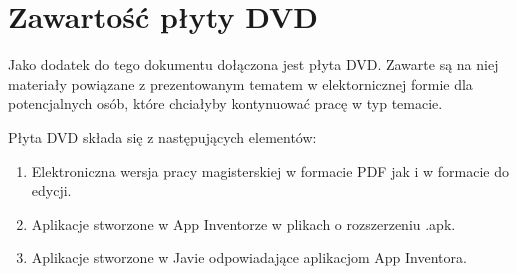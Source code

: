 \chapter{Zawartość płyty DVD}

Jako dodatek do tego dokumentu dołączona jest płyta DVD. Zawarte są na niej materiały powiązane z prezentowanym tematem w elektornicznej formie dla potencjalnych osób, które chciałyby kontynuować pracę w typ temacie.

Płyta DVD składa się z następujących elementów:
\begin{enumerate}
\item Elektroniczna wersja pracy magisterskiej w formacie PDF jak i w formacie do edycji.
\item Aplikacje stworzone w App Inventorze w plikach o rozszerzeniu .apk.
\item Aplikacje stworzone w Javie odpowiadające aplikacjom App Inventora.
\end{enumerate}

